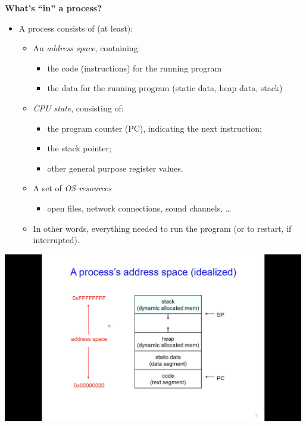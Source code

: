 \documentclass[11pt,a4paper]{article}
\begin{document}
\textbf{What's ``in'' a process?}
\begin{itemize}
    \item A process consists of (at least):
        \begin{itemize}
            \item An \emph{address space}, containing:
                \begin{itemize}
                    \item the code (instructions) for the running program
                    \item the data for the running program (static data, heap data, stack)
                \end{itemize}
            \item \emph{CPU state}, consisting of:
                \begin{itemize}
                    \item the program counter (PC), indicating the next instruction;
                    \item the stack pointer;
                    \item other general purpose register values.
                \end{itemize}
            \item A set of \emph{OS resources}
                \begin{itemize}
                    \item open files, network connections, sound channels, \dots
                \end{itemize}
            \item In other words, everything needed to run the program
                (or to restart, if interrupted).
        \end{itemize}
\end{itemize}

\includegraphics[height=280]{a-process-address-space.jpg}
\end{document}
